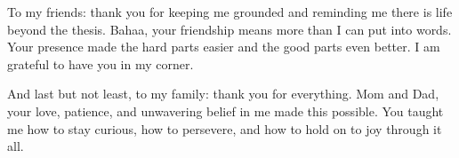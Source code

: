 To my friends: thank you for keeping me grounded and reminding me there is life beyond the thesis. Bahaa, your friendship means more than I can put into words. Your presence made the hard parts easier and the good parts even better. I am grateful to have you in my corner.

And last but not least, to my family: thank you for everything. Mom and Dad, your love, patience, and unwavering belief in me made this possible. You taught me how to stay curious, how to persevere, and how to hold on to joy through it all.











